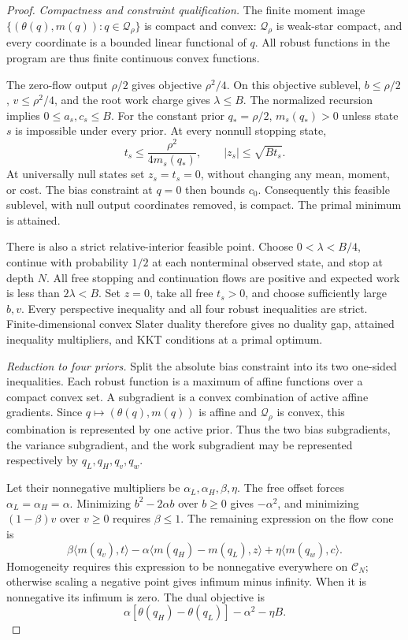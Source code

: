 \begin{proof}
\emph{Compactness and constraint qualification.}
The finite moment image
$\{(\theta(q),m(q)):q\in\mathcal Q_\rho\}$ is compact and convex:
$\mathcal Q_\rho$ is weak-star compact, and every coordinate is a bounded
linear functional of $q$. All robust functions in the program are thus
finite continuous convex functions.

The zero-flow output $\rho/2$ gives objective $\rho^2/4$. On this objective
sublevel, $b\le\rho/2$, $v\le\rho^2/4$, and the root work charge gives
$\lambda\le B$. The normalized recursion implies $0\le a_s,c_s\le B$.
For the constant prior $q_*=\rho/2$, $m_s(q_*)>0$ unless state $s$ is
impossible under every prior. At every nonnull stopping state,
\[
 t_s\le\frac{\rho^2}{4m_s(q_*)},\qquad |z_s|\le\sqrt{Bt_s}.
\]
At universally null states set $z_s=t_s=0$, without changing any mean,
moment, or cost. The bias constraint at $q=0$ then bounds $c_0$.
Consequently this feasible sublevel, with null output coordinates removed,
is compact. The primal minimum is attained.

There is also a strict relative-interior feasible point. Choose
$0<\lambda<B/4$, continue with probability $1/2$ at each nonterminal
observed state, and stop at depth $N$. All free stopping and continuation
flows are positive and expected work is less than $2\lambda<B$.
Set $z=0$, take all free $t_s>0$, and choose sufficiently large $b,v$.
Every perspective inequality and all four robust inequalities are strict.
Finite-dimensional convex Slater duality therefore gives no duality gap,
attained inequality multipliers, and KKT conditions at a primal optimum.

\emph{Reduction to four priors.}
Split the absolute bias constraint into its two one-sided inequalities.
Each robust function is a maximum of affine functions over a compact
convex set. A subgradient is a convex combination of active affine
gradients. Since $q\mapsto(\theta(q),m(q))$ is affine and
$\mathcal Q_\rho$ is convex, this combination is represented by one active
prior. Thus the two bias subgradients, the variance subgradient, and the
work subgradient may be represented respectively by
$q_L,q_H,q_v,q_w$.

Let their nonnegative multipliers be $\alpha_L,\alpha_H,\beta,\eta$.
The free offset forces $\alpha_L=\alpha_H=\alpha$. Minimizing
$b^2-2\alpha b$ over $b\ge0$ gives $-\alpha^2$, and minimizing
$(1-\beta)v$ over $v\ge0$ requires $\beta\le1$. The remaining expression
on the flow cone is
\begin{equation}
 \beta\langle m(q_v),t\rangle
 -\alpha\langle m(q_H)-m(q_L),z\rangle
 +\eta\langle m(q_w),c\rangle.
 \label{eq:dual-cone-functional}
\end{equation}
Homogeneity requires this expression to be nonnegative everywhere on
$\mathcal C_N$; otherwise scaling a negative point gives infimum minus
infinity. When it is nonnegative its infimum is zero. The dual objective is
\begin{equation}
 \alpha[\theta(q_H)-\theta(q_L)]-\alpha^2-\eta B.
 \label{eq:dual-price-objective}
\end{equation}


\end{proof}
